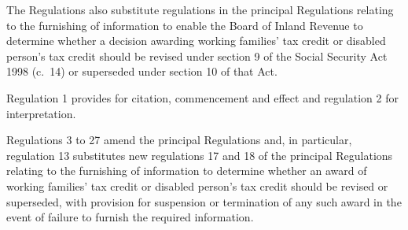 \documentclass[12pt,a4paper]{article}
\begin{document}
The Regulations also substitute regulations in the principal Regulations relating to the furnishing of information to enable the Board of Inland Revenue to determine whether a decision awarding working families' tax credit or disabled person’s tax credit should be revised under section 9 of the Social Security Act 1998 (c.\ 14) or superseded under section 10 of that Act.

Regulation 1 provides for citation, commencement and effect and regulation 2 for interpretation.

Regulations 3 to 27 amend the principal Regulations and, in particular, regulation 13 substitutes new regulations 17 and 18 of the principal Regulations relating to the furnishing of information to determine whether an award of working families' tax credit or disabled person’s tax credit should be revised or superseded, with provision for suspension or termination of any such award in the event of failure to furnish the required information. 
\end{document}
